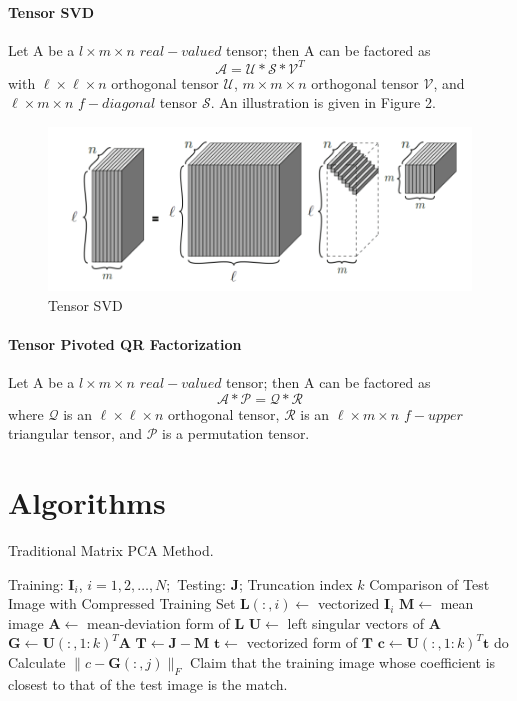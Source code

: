 \documentclass[english]{article}
\newcommand{\<}{\langle}
\renewcommand{\>}{\rangle}
\theoremstyle{definition}
\begin{document}
\paragraph{Tensor SVD} 
Let A be a $l \times m \times n$ $real-valued$ tensor; 
then A can be factored as 
$$\mathcal{A}=\mathcal{U} * \mathcal{S} * \mathcal{V}^{T}$$
with $\ell \times \ell \times n$ orthogonal tensor $\mathcal{U}$, $m \times m \times n$ orthogonal tensor $\mathcal{V}$, and $\ell \times m \times n$ $f-diagonal$ tensor $\mathcal{S}$. An illustration is given in Figure 2.
\begin{figure}[!h]
	\centering
	\includegraphics[scale=0.8]{tsvd}
	\caption{Tensor SVD}
\end{figure}
\paragraph{Tensor Pivoted QR Factorization} 
Let A be a $l \times m \times n$ $real-valued$ tensor; 
then A can be factored as 
$$\mathcal{A} * \mathcal{P}=\mathcal{Q} * \mathcal{R}$$
where $\mathcal{Q}$ is an $\ell \times \ell \times n$ orthogonal tensor, $\mathcal{R}$ is an $\ell \times m \times n$ $f-upper$ triangular tensor, and
$\mathcal{P}$ is a permutation tensor.
\section{Algorithms}
\begin{algorithm}  
	\caption{Traditional Matrix PCA Method.}
	\begin{algorithmic} 
		\Require  
		Training:  $\mathbf{I}_{i}$, $i=1,2, \ldots, N; $ Testing: $ \mathbf{J}$;  Truncation index $ k $
		\Ensure  
		Comparison of Test Image with Compressed Training Set  
		\State $ \mathbf{L}(:, i) \leftarrow $ vectorized $ \mathbf{I}_{i} $
		\EndFor
		\State $ \mathbf{M} \leftarrow $ mean image
		\State $ \mathbf{A} \leftarrow $ mean-deviation form of $ \mathbf{L}  $
		\State $ \mathbf{U} \leftarrow $ left singular vectors of $ \mathbf{A} $  
		\State $\mathbf{G} \leftarrow \mathbf{U}(:, 1: k)^{T} \mathbf{A} $
		\State $ \mathbf{T} \leftarrow \mathbf{J}-\mathbf{M} $
		\State $ \mathbf{t} \leftarrow $ vectorized form of $ \mathbf{T} $  
		\State $ \mathbf{c} \leftarrow \mathbf{U}(:, 1: k)^{T} \mathbf{t}  $
		\State do Calculate $ \|c-\mathbf{G}(:, j)\|_{F}$
		\EndFor
		\State Claim that the training image whose coefficient is closest to that of the test image is the match. 
	\end{algorithmic}
\end{algorithm}  
\end{document}
